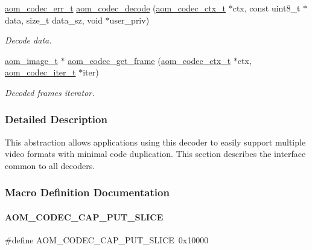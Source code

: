 \begin{DoxyCompactItemize}
\hyperlink{group__codec_gaaae61e0f8663e6137f1e228757248e7c}{aom\+\_\+codec\+\_\+err\+\_\+t} \hyperlink{group__decoder_gab03fdb999d1f83a5896869a3ba5f68f7}{aom\+\_\+codec\+\_\+decode} (\hyperlink{group__codec_ga9a1d27f9742d9f70783e3c6cb849b5b4}{aom\+\_\+codec\+\_\+ctx\+\_\+t} $\ast$ctx, const uint8\+\_\+t $\ast$data, size\+\_\+t data\+\_\+sz, void $\ast$user\+\_\+priv)
\begin{DoxyCompactList}\small\item\em Decode data. \end{DoxyCompactList}\item 
\hyperlink{aom__image_8h_a5409ae8fdb326fe1cc32622ef4e23748}{aom\+\_\+image\+\_\+t} $\ast$ \hyperlink{group__decoder_ga780aad27a2728abefab725faa3bc4f79}{aom\+\_\+codec\+\_\+get\+\_\+frame} (\hyperlink{group__codec_ga9a1d27f9742d9f70783e3c6cb849b5b4}{aom\+\_\+codec\+\_\+ctx\+\_\+t} $\ast$ctx, \hyperlink{group__codec_gadf9e173c9e02788a9999399edab20a02}{aom\+\_\+codec\+\_\+iter\+\_\+t} $\ast$iter)
\begin{DoxyCompactList}\small\item\em Decoded frames iterator. \end{DoxyCompactList}\end{DoxyCompactItemize}


\subsubsection{Detailed Description}
This abstraction allows applications using this decoder to easily support multiple video formats with minimal code duplication. This section describes the interface common to all decoders. 

\subsubsection{Macro Definition Documentation}
\mbox{\label{group__decoder_ga1e50f39bf0434fc5d18aeed80e06d044}} 
\paragraph{\texorpdfstring{A\+O\+M\+\_\+\+C\+O\+D\+E\+C\+\_\+\+C\+A\+P\+\_\+\+P\+U\+T\+\_\+\+S\+L\+I\+CE}{AOM\_CODEC\_CAP\_PUT\_SLICE}}
{\footnotesize\ttfamily \#define A\+O\+M\+\_\+\+C\+O\+D\+E\+C\+\_\+\+C\+A\+P\+\_\+\+P\+U\+T\+\_\+\+S\+L\+I\+CE~0x10000}




